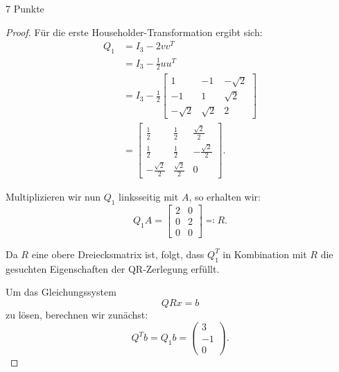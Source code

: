 \documentclass{problemset}
\begin{document}
\begin{problem}{7 Punkte}
\begin{proof}
    Für die erste Householder-Transformation ergibt sich:
    \begin{align*}
        Q_1 & = I_3 - 2 v v^T                                                                              \\
            & = I_3 - \frac{1}{2} u u^T                                                                    \\
            & = I_3 - \frac{1}{2} \begin{bmatrix}
                                      1         & -1       & -\sqrt{2} \\
                                      -1        & 1        & \sqrt{2}  \\
                                      -\sqrt{2} & \sqrt{2} & 2
                                  \end{bmatrix}                                         \\
            & = \begin{bmatrix}
                    \frac{1}{2}         & \frac{1}{2}        & \frac{\sqrt{2}}{2}  \\
                    \frac{1}{2}         & \frac{1}{2}        & -\frac{\sqrt{2}}{2} \\
                    -\frac{\sqrt{2}}{2} & \frac{\sqrt{2}}{2} & 0
                \end{bmatrix}.
    \end{align*}

    Multiplizieren wir nun \( Q_1 \) linksseitig mit \( A \), so erhalten wir:
    \begin{equation*}
        Q_1 A = \begin{bmatrix}
            2 & 0 \\
            0 & 2 \\
            0 & 0
        \end{bmatrix} \eqcolon R.
    \end{equation*}

    Da \( R \) eine obere Dreiecksmatrix ist, folgt, dass \( Q_1^T \) in
    Kombination mit \( R \) die gesuchten Eigenschaften der QR-Zerlegung
    erfüllt.

    Um das Gleichungssystem
    \begin{equation*}
        QRx = b
    \end{equation*}
    zu lösen, berechnen wir zunächst:
    \begin{equation*}
        Q^T b = Q_1 b = \begin{pmatrix}
            3 \\ -1 \\ 0
        \end{pmatrix}.
    \end{equation*}


\end{proof}
\end{problem}
\end{document}
